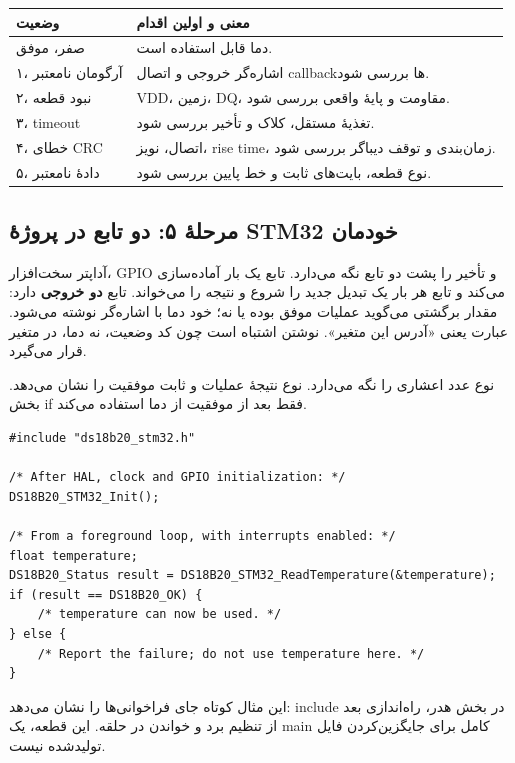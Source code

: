 \begin{center}
\begin{tabular}{p{35mm}p{94mm}}
\toprule
وضعیت & معنی و اولین اقدام\\
\midrule
صفر، موفق & دما قابل استفاده است.\\
۱، آرگومان نامعتبر & اشاره‌گر خروجی و اتصال callbackها بررسی شود.\\
۲، نبود قطعه & VDD، زمین، DQ، مقاومت و پایهٔ واقعی بررسی شود.\\
۳، timeout & تغذیهٔ مستقل، کلاک و تأخیر بررسی شود.\\
۴، خطای CRC & اتصال، نویز، rise time، زمان‌بندی و توقف دیباگر بررسی شود.\\
۵، دادهٔ نامعتبر & نوع قطعه، بایت‌های ثابت و خط پایین بررسی شود.\\
\bottomrule
\end{tabular}
\end{center}

\subsection{مرحلهٔ ۵: دو تابع در پروژهٔ STM32 خودمان}
آداپتر سخت‌افزار، GPIO و تأخیر را پشت دو تابع نگه می‌دارد. تابع
یک بار آماده‌سازی می‌کند و تابع
هر بار یک تبدیل جدید را شروع و نتیجه را می‌خواند.
تابع
\textbf{دو خروجی}
دارد: مقدار برگشتی می‌گوید عملیات موفق بوده یا نه؛ خود دما با اشاره‌گر نوشته می‌شود. عبارت
یعنی «آدرس این متغیر». نوشتن
اشتباه است چون کد وضعیت، نه دما، در متغیر قرار می‌گیرد.

نوع
عدد اعشاری را نگه می‌دارد. نوع
نتیجۀ عملیات و ثابت
موفقیت را نشان می‌دهد. بخش if فقط بعد از موفقیت از دما استفاده می‌کند.

\begin{LTR}
\begin{lstlisting}
#include "ds18b20_stm32.h"

/* After HAL, clock and GPIO initialization: */
DS18B20_STM32_Init();

/* From a foreground loop, with interrupts enabled: */
float temperature;
DS18B20_Status result = DS18B20_STM32_ReadTemperature(&temperature);
if (result == DS18B20_OK) {
    /* temperature can now be used. */
} else {
    /* Report the failure; do not use temperature here. */
}
\end{lstlisting}
\end{LTR}
این مثال کوتاه جای فراخوانی‌ها را نشان می‌دهد: include در بخش هدر، راه‌اندازی بعد از تنظیم برد و خواندن در حلقه. این قطعه، یک main کامل برای جایگزین‌کردن فایل تولیدشده نیست.



